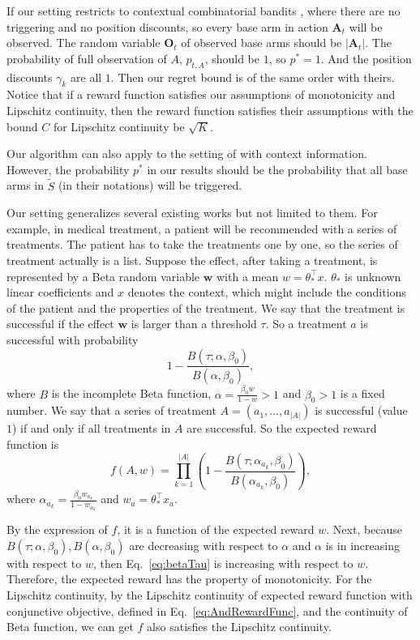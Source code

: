 \documentclass{article}
\newcommand{\bA}{\mathbf{A}}
\newcommand{\bO}{\mathbf{O}}
\newcommand{\bw}{\mathbf{w}}
\begin{document}
If our setting restricts to contextual combinatorial bandits \cite{qin2014contextual}, where there are no triggering and no position discounts, so every base arm in action $\bA_t$ will be observed. The random variable $\bO_t$ of observed base arms should be $|\bA_t|$. The probability of full observation of $A$, $p_{t, A}$, should be $1$, so $p^{\ast} = 1$. And the position discounts $\gamma_k$ are all $1$. Then our regret bound is of the same order with theirs. Notice that if a reward function satisfies our assumptions of monotonicity and Lipschitz continuity, then the reward function satisfies their assumptions with the bound $C$ for Lipschitz continuity be $\sqrt{K}$.

Our algorithm can also apply to the setting of \cite{chen2013combinatorial} with context information. However, the probability $p^{\ast}$ in our results should be the probability that all base arms in $\tilde{S}$ (in their notations) will be triggered.

Our setting generalizes several existing works but not limited to them. For example, in medical treatment, a patient will be recommended with a series of treatments. The patient has to take the treatments one by one, so the series of treatment actually is a list. Suppose the effect, after taking a treatment, is represented by a Beta random variable $\bw$ with a mean $w = \theta_*^{\top}x$. $\theta_*$ is unknown linear coefficients and $x$ denotes the context, which might include the conditions of the patient and the properties of the treatment. We say that the treatment is successful if the effect $\bw$ is larger than a threshold $\tau$. So a treatment $a$ is successful with probability
\begin{equation}
\label{eq:betaTau}
1 - \frac{B(\tau; \alpha, \beta_0)}{B(\alpha, \beta_0)},
\end{equation}
where $B$ is the incomplete Beta function, $\alpha = \frac{\beta_0 w}{1- w} > 1$ and $\beta_0 > 1$ is a fixed number. We say that a series of treatment $A = (a_1, \ldots, a_{|A|})$ is successful (value $1$) if and only if all treatments in $A$ are successful. So the expected reward function is
$$
f(A, w) = \prod_{k=1}^{|A|} (1 - \frac{B(\tau; \alpha_{a_k}, \beta_0)}{B(\alpha_{a_k}, \beta_0)}),
$$
where $\alpha_{a_k} = \frac{\beta_0 w_{a_k}}{1- w_{a_k}}$ and $w_a = \theta_*^{\top}x_{a}$.

By the expression of $f$, it is a function of the expected reward $w$. Next, because $B(\tau; \alpha, \beta_0), B(\alpha, \beta_0)$ are decreasing with respect to $\alpha$ and $\alpha$ is in increasing with respect to $w$, then Eq.~\eqref{eq:betaTau} is increasing with respect to $w$. Therefore, the expected reward has the property of monotonicity. For the Lipschitz continuity, by the Lipschitz continuity of expected reward function with conjunctive objective, defined in Eq.~\eqref{eq:AndRewardFunc}, and the continuity of Beta function, we can get $f$ also satisfies the Lipschitz continuity.
\end{document}
